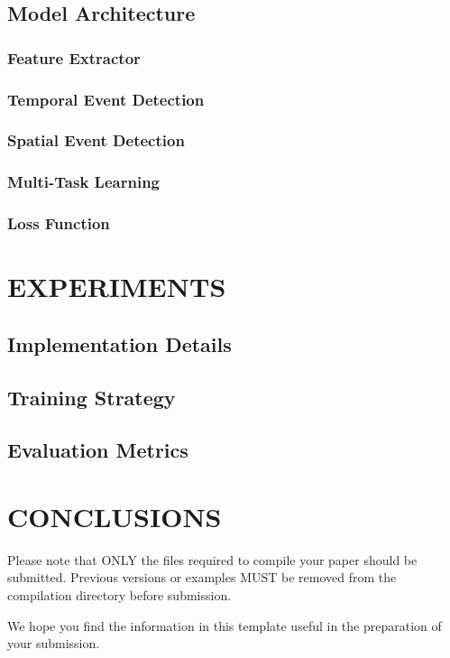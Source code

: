 \documentclass[a4paper,twoside]{article}
\begin{document}
\subsection{Model Architecture}
\subsubsection{Feature Extractor}
\subsubsection{Temporal Event Detection}
\subsubsection{Spatial Event Detection}
\subsubsection{Multi-Task Learning}
\subsubsection{Loss Function}


\section{\uppercase{EXPERIMENTS}}
\label{sec:experiments}
\subsection{Implementation Details}
\subsection{Training Strategy}
\subsection{Evaluation Metrics}

\section{\uppercase{CONCLUSIONS}}
\label{sec:conclusions}

Please note that ONLY the files required to compile your paper should be submitted. Previous versions or examples MUST be removed from the compilation directory before submission.

We hope you find the information in this template useful in the preparation of your submission.
\end{document}
